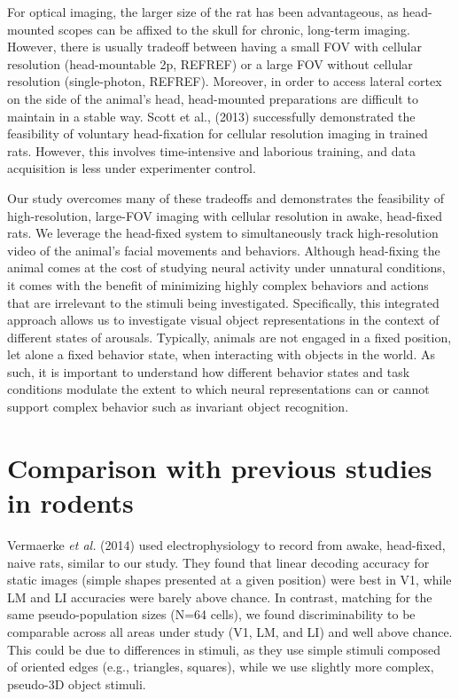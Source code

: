 For optical imaging, the larger size of the rat has been advantageous, as head-mounted scopes can be affixed to the skull for chronic, long-term imaging. However, there is usually tradeoff between having a small FOV with cellular resolution (head-mountable 2p, REFREF) or a large FOV without cellular resolution (single-photon, REFREF). Moreover, in order to access lateral cortex on the side of the animal’s head, head-mounted preparations are difficult to maintain in a stable way. Scott et al., (2013) successfully demonstrated the feasibility of voluntary head-fixation for cellular resolution imaging in trained rats. However, this involves time-intensive and laborious training, and data acquisition is less under experimenter control. 

Our study overcomes many of these tradeoffs and demonstrates the feasibility of high-resolution, large-FOV imaging with cellular resolution in awake, head-fixed rats. We leverage the head-fixed system to simultaneously track high-resolution video of the animal’s facial movements and behaviors. Although head-fixing the animal comes at the cost of studying neural activity under unnatural conditions, it comes with the benefit of minimizing highly complex behaviors and actions that are irrelevant to the stimuli being investigated. Specifically, this integrated approach allows us to investigate visual object representations in the context of different states of arousals. Typically, animals are not engaged in a fixed position, let alone a fixed behavior state, when interacting with objects in the world. As such, it is important to understand how different behavior states and task conditions modulate the extent to which neural representations can or cannot support complex behavior such as invariant object recognition.


\section{Comparison with previous studies in rodents}
Vermaerke \textit{et al.} (2014) used electrophysiology to record from awake, head-fixed, naive rats, similar to our study. They found that linear decoding accuracy for static images (simple shapes presented at a given position) were best in V1, while LM and LI accuracies were barely above chance. In contrast, matching for the same pseudo-population sizes (N=64 cells), we found discriminability to be comparable across all areas under study (V1, LM, and LI) and well above chance. This could be due to differences in stimuli, as they use simple stimuli composed of oriented edges (e.g., triangles, squares), while we use slightly more complex, pseudo-3D object stimuli.


